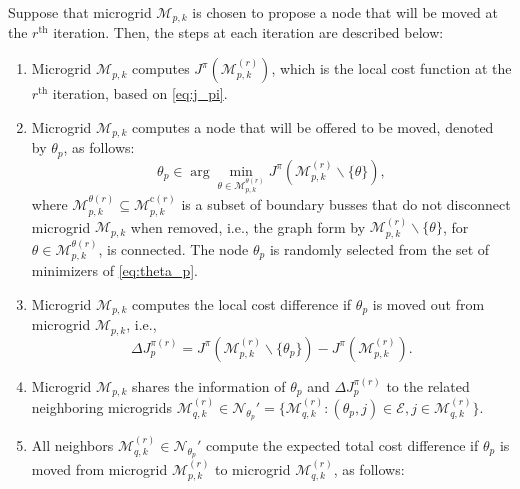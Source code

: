 \begin{alg}
	\label{alg:repartitioning}
	Suppose that microgrid $\mathcal{M}_{p,k}$ is chosen to propose a node that will be moved at the $r^{\text{th}}$ iteration. Then, the steps at each iteration are described below:
	
	\begin{enumerate}
		\item Microgrid $\mathcal{M}_{p,k}$ computes $J^{\pi}(\mathcal{M}_{p,k}^{(r)})$, which is the local cost function at the $r^{\text{th}}$ iteration, based on \eqref{eq:j_pi}.
		\item Microgrid $\mathcal{M}_{p,k}$ computes a node that will be offered to be moved, denoted by $\theta_p$, as follows:
		\begin{equation}
		\theta_p \in \arg\min_{\theta \in \mathcal{M}_{p,k}^{\theta(r)}} J^{\pi}(\mathcal{M}_{p,k}^{(r)}\backslash\{\theta \}),
		\label{eq:theta_p}
		\end{equation}
		where $\mathcal{M}_{p,k}^{\theta(r)} \subseteq \mathcal{M}_{p,k}^{\mathrm{c}(r)}$ is a subset of boundary busses that do not disconnect microgrid $\mathcal{M}_{p,k}$ when removed, i.e., the graph form by $\mathcal{M}_{p,k}^{(r)} \backslash \{\theta \}$, for $\theta \in \mathcal{M}_{p,k}^{\theta(r)}$, is connected. The node   $\theta_p$ is randomly selected from the set of minimizers of \eqref{eq:theta_p}.
		\item %
		Microgrid $\mathcal{M}_{p,k}$ computes the local cost difference if $\theta_p$ is moved out from microgrid $\mathcal{M}_{p,k}$, i.e.,
		\begin{equation}
		\Delta J^{\pi(r)}_p = J^{\pi}(\mathcal{M}_{p,k}^{(r)}\backslash\{\theta_p \}) - J^{\pi}(\mathcal{M}_{p,k}^{(r)}).
		\label{eq:delta_Jp}
		\end{equation} 
		\item Microgrid $\mathcal{M}_{p,k}$ shares the information of $\theta_p$ and $\Delta J^{\pi(r)}_p$ to the related neighboring microgrids $\mathcal{M}_{q,k}^{(r)} \in \mathcal{N}_{\theta_p}'=
		\{\mathcal{M}_{q,k}^{(r)}: (\theta_p,j) \in \mathcal{E}, j \in \mathcal{M}_{q,k}^{(r)} \}$.
		\item  All neighbors $\mathcal{M}_{q,k}^{(r)} \in \mathcal{N}_{\theta_p}'$ compute the expected total cost difference if $\theta_p$ is moved from microgrid $\mathcal{M}_{p,k}^{(r)}$ to microgrid $\mathcal{M}_{q,k}^{(r)}$, as follows:
		\begin{equation}

\end{equation}
\end{enumerate}
\end{alg}
